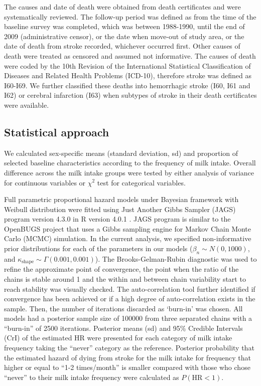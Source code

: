 \documentclass[nutrients,article,submit,moreauthors,pdftex]{mdpi}
\begin{document}
The causes and date of death were obtained from death certificates and
were systematically reviewed. The follow-up period was defined as from
the time of the baseline survey was completed, which was between
1988-1990, until the end of 2009 (administrative censor), or the date
when move-out of study area, or the date of death from stroke recorded,
whichever occurred first. Other causes of death were treated as censored
and assumed not informative. The causes of death were coded by the 10th
Revision of the International Statistical Classification of Diseases and
Related Health Problems (ICD-10), therefore stroke was defined as
I60-I69. We further classified these deaths into hemorrhagic stroke
(I60, I61 and I62) or cerebral infarction (I63) when subtypes of stroke
in their death certificates were available.

\hypertarget{statistical-approach}{%
\subsection{Statistical approach}\label{statistical-approach}}

We calculated sex-specific means (standard deviation, sd) and proportion
of selected baseline characteristics according to the frequency of milk
intake. Overall difference across the milk intake groups were tested by
either analysis of variance for continuous variables or \(\chi^2\) test
for categorical variables.

Full parametric proportional hazard models under Bayesian framework with
Weibull distribution were fitted using Just Another Gibbs Sampler (JAGS)
program \citep{Plummer2003} version 4.3.0 in R version 4.0.1
\citep{RCT2020}. JAGS program is similar to the OpenBUGS
\citep{Lunn2009} project that uses a Gibbs sampling engine for Markov
Chain Monte Carlo (MCMC) simulation. In the current analysis, we
specified non-informative prior distributions for each of the parameters
in our models (\(\beta_n \sim N(0, 1000)\), and
\(\kappa_{\text{shape}} \sim \Gamma(0.001, 0.001)\)). The
Brooks-Gelman-Rubin diagnostic \citep{Brooks1998} was used to refine the
approximate point of convergence, the point when the ratio of the chains
is stable around 1 and the within and between chain variability start to
reach stability was visually checked. The auto-correlation tool further
identified if convergence has been achieved or if a high degree of
auto-correlation exists in the sample. Then, the number of iterations
discarded as `burn-in' was chosen. All models had a posterior sample
size of 100000 from three separated chains with a ``burn-in'' of 2500
iterations. Posterior means (sd) and 95\% Credible Intervals (CrI) of
the estimated HR were presented for each category of milk intake
frequency taking the ``never'' category as the reference. Posterior
probability that the estimated hazard of dying from stroke for the milk
intake for frequency that higher or equal to ``1-2 times/month'' is
smaller compared with those who chose ``never'' to their milk intake
frequency were calculated as \(P(\text{HR} < 1)\).
\end{document}
